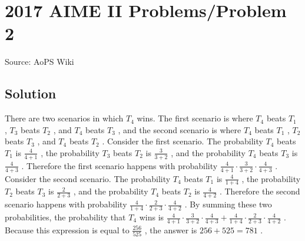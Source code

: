 \documentclass[12pt]{article}
\begin{document}
\section*{{2017 AIME II Problems/Problem 2}}
Source: AoPS Wiki

\subsection*{Solution}
There are two scenarios in which $T_4$ wins. The first scenario is where $T_4$ beats $T_1$ , $T_3$ beats $T_2$ , and $T_4$ beats $T_3$ , and the second scenario is where $T_4$ beats $T_1$ , $T_2$ beats $T_3$ , and $T_4$ beats $T_2$ . Consider the first scenario. The probability $T_4$ beats $T_1$ is $\frac{4}{4+1}$ , the probability $T_3$ beats $T_2$ is $\frac{3}{3+2}$ , and the probability $T_4$ beats $T_3$ is $\frac{4}{4+3}$ . Therefore the first scenario happens with probability $\frac{4}{4+1}\cdot\frac{3}{3+2}\cdot\frac{4}{4+3}$ . Consider the second scenario. The probability $T_4$ beats $T_1$ is $\frac{4}{1+4}$ , the probability $T_2$ beats $T_3$ is $\frac{2}{2+3}$ , and the probability $T_4$ beats $T_2$ is $\frac{4}{4+2}$ . Therefore the second scenario happens with probability $\frac{4}{1+4}\cdot\frac{2}{2+3}\cdot\frac{4}{4+2}$ . By summing these two probabilities, the probability that $T_4$ wins is $\frac{4}{4+1}\cdot\frac{3}{3+2}\cdot\frac{4}{4+3}+\frac{4}{1+4}\cdot\frac{2}{2+3}\cdot\frac{4}{4+2}$ . Because this expression is equal to $\frac{256}{525}$ , the answer is $256+525=\boxed{781}$ .
\end{document}
